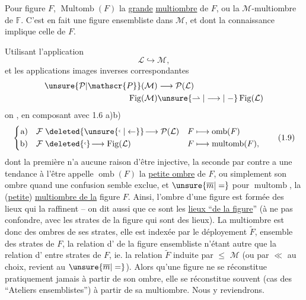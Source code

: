 Pour  figure $F$, $\operatorname{Multomb}(F)$   la \uline{grande} \uline{multiombre} de $F$, ou la $\mathcal{M}$-multiombre de $\mathbb{F}$.  C'est en fait une figure ensembliste dans $\mathcal{M}$, et dont la connaissance implique celle de $F$.

 Utilisant   l'application
\[
\mathcal{L}\hookrightarrow\mathcal{M},
\]
et les applications images inverses correspondantes
\[
\begin{aligned}
\unsure{\mathcal{P}|\mathscr{P}}(\mathcal{M})&\longrightarrow\mathcal{P}(\mathcal{L})\\
\operatorname{Fig}(\mathcal{M})&\unsure{\rightharpoonup|\longrightarrow|\relbar}\operatorname{Fig}(\mathcal{L})
\end{aligned}
\]
on , en composant avec 1.6 a)b)
\[
\left\{\begin{aligned}
\text{a)}\quad \mathcal{F}&\mathrel{\deleted{\unsure{\lhook|\leftarrow}}\!\longrightarrow}\mathcal{P}(\mathcal{L})&
 F&\longmapsto\operatorname{omb}(F)\\
\text{b)}\quad \mathcal{F}&\mathrel{\deleted{\lhook}\!\longrightarrow}\operatorname{Fig}(\mathcal{L})&
 F&\longmapsto\operatorname{multomb}(F),
\end{aligned}\right.\tag*{(1.9)}
\]
dont la première n'a aucune raison d'être injective, la seconde par contre a une tendance à l'être   appelle $\operatorname{omb}(F)$ la \uline{petite ombre} de $F$, ou simplement son ombre quand une confusion semble exclue, et  $\unsure{\overline m|=}$ pour $\operatorname{multomb}$, la (\uline{petite}) \uline{multiombre de la} figure $F$.
Ainsi, l'ombre d'une figure est formée des lieux qui la raffinent -- on dit aussi que ce sont les \uline{lieux ``de la figure}'' (à ne pas confondre, avec les strates de la figure qui sont des lieux). La multiombre est donc  des ombres de ses strates, elle est indexée par le déployement $\widetilde F$, ensemble des strates de $F$, la relation d' de la figure ensembliste n'étant autre que la relation d' entre strates de $F$, ie. la relation  $\widetilde F$ induite par $\leq$  $\mathcal{M}$ (ou par $\ll$ au choix,  revient au $\unsure{\overline m|=}$). Alors qu'une figure ne se réconstitue pratiquement jamais à partir de son ombre, elle se réconstitue  souvent (cas des ``Ateliers ensemblistes'') à partir de sa multiombre. Nous y reviendrons.

